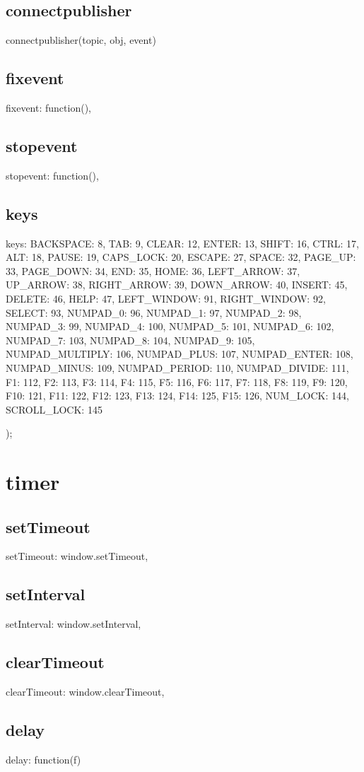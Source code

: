 {{{{{{\subsection*{connectpublisher}
connectpublisher(topic, obj, event) {
\subsection*{fixevent}
fixevent: function(){},
\subsection*{stopevent}
stopevent: function(){},
\subsection*{keys}
keys: { BACKSPACE: 8, TAB: 9, CLEAR: 12, ENTER: 13, SHIFT: 16, CTRL: 17, ALT: 18, PAUSE: 19, CAPS_LOCK: 20, 
		    ESCAPE: 27, SPACE: 32, PAGE_UP: 33, PAGE_DOWN: 34, END: 35, HOME: 36, LEFT_ARROW: 37, UP_ARROW: 38,
		    RIGHT_ARROW: 39, DOWN_ARROW: 40, INSERT: 45, DELETE: 46, HELP: 47, LEFT_WINDOW: 91, RIGHT_WINDOW: 92,
		    SELECT: 93, NUMPAD_0: 96, NUMPAD_1: 97, NUMPAD_2: 98, NUMPAD_3: 99, NUMPAD_4: 100, NUMPAD_5: 101,
		    NUMPAD_6: 102, NUMPAD_7: 103, NUMPAD_8: 104, NUMPAD_9: 105, NUMPAD_MULTIPLY: 106, NUMPAD_PLUS: 107,
		    NUMPAD_ENTER: 108, NUMPAD_MINUS: 109, NUMPAD_PERIOD: 110, NUMPAD_DIVIDE: 111, F1: 112, F2: 113, F3: 114,
		    F4: 115, F5: 116, F6: 117, F7: 118, F8: 119, F9: 120, F10: 121, F11: 122, F12: 123, F13: 124, 
		    F14: 125, F15: 126, NUM_LOCK: 144, SCROLL_LOCK: 145 }
    });

\section{timer}
\subsection*{setTimeout}
setTimeout: window.setTimeout,
\subsection*{setInterval}
setInterval: window.setInterval,
\subsection*{clearTimeout}
clearTimeout: window.clearTimeout,
\subsection*{delay}
delay: function(f) {
}}}}}}}
